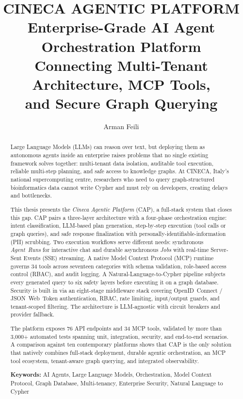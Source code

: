 \documentclass[a4paper]{sapthesis}
\title{CINECA AGENTIC PLATFORM\\
       Enterprise-Grade AI Agent Orchestration Platform\\
       Connecting Multi-Tenant Architecture, MCP Tools,\\
       and Secure Graph Querying}
\author{Arman Feili}
\newcommand{\ToolCount}{34}
\newcommand{\EndpointCount}{76}
\newcommand{\TestCount}{3,000+}
\begin{document}
\frontmatter

\maketitle

\begin{abstract}
    Large Language Models (LLMs) can reason over text, but deploying them as
    autonomous agents inside an enterprise raises problems that no single
    existing framework solves together: multi-tenant data isolation, auditable
    tool execution, reliable multi-step planning, and safe access to knowledge
    graphs.  At CINECA, Italy's national supercomputing centre, researchers
    who need to query graph-structured bioinformatics data cannot write Cypher
    and must rely on developers, creating delays and bottlenecks.

    This thesis presents the \emph{Cineca Agentic Platform} (CAP), a
    full-stack system that closes this gap.  CAP pairs a three-layer
    architecture with a four-phase orchestration engine: intent
    classification, LLM-based plan generation, step-by-step execution
    (tool calls or graph queries), and safe response finalization with
    personally-identifiable-information (PII) scrubbing.  Two execution
    workflows serve different needs: synchronous \emph{Agent~Runs} for
    interactive chat and durable asynchronous \emph{Jobs} with real-time
    Server-Sent Events (SSE) streaming.  A native Model Context Protocol
    (MCP) runtime governs \ToolCount{} tools across seventeen categories with
    schema validation, role-based access control (RBAC), and audit logging.
    A Natural-Language-to-Cypher pipeline subjects every generated query to
    six safety layers before executing it on a graph database.  Security is
    built in via an eight-stage middleware stack covering OpenID~Connect /
    JSON~Web~Token authentication, RBAC, rate limiting, input/output guards,
    and tenant-scoped filtering.  The architecture is LLM-agnostic with
    circuit breakers and provider fallback.

    The platform exposes \EndpointCount{} API endpoints and \ToolCount{} MCP
    tools, validated by more than \TestCount{} automated tests spanning unit,
    integration, security, and end-to-end scenarios.  A comparison against
    ten contemporary platforms shows that CAP is the only solution that
    natively combines full-stack deployment, durable agentic orchestration,
    an MCP tool ecosystem, tenant-aware graph querying, and integrated
    observability.

    \vspace{0.4cm}
    \noindent\textbf{Keywords:} AI Agents, Large Language Models,
    Orchestration, Model Context Protocol, Graph Database, Multi-tenancy,
    Enterprise Security, Natural Language to Cypher
\end{abstract}
\end{document}
